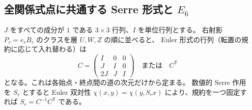 \subsection{全関係式点に共通する Serre 形式と $E_6$}
$J$ をすべての成分が $1$ である $3\times3$ 行列、$I$ を単位行列とする。
右射影 $P_v=e_vB_r$ のクラスを層 $U,W,Z$ の順に並べると、
Euler 形式の行列（転置の規約に応じて入れ替わる）は
\begin{equation}\label{eq:aou-constant-euler}
 C=\begin{pmatrix}I&0&0\\J&I&0\\2J&J&I\end{pmatrix}
 \quad\text{または}\quad C^{\mathsf T}
\end{equation}
となる。これは各始点・終点間の道の次元だけから定まる。
数値的 Serre 作用を $S_r$ とすると Euler 双対性
$\chi(x,y)=\chi(y,S_rx)$ により、規約を一つ固定すれば
$S_r=C^{-1}C^{\mathsf T}$ である。

